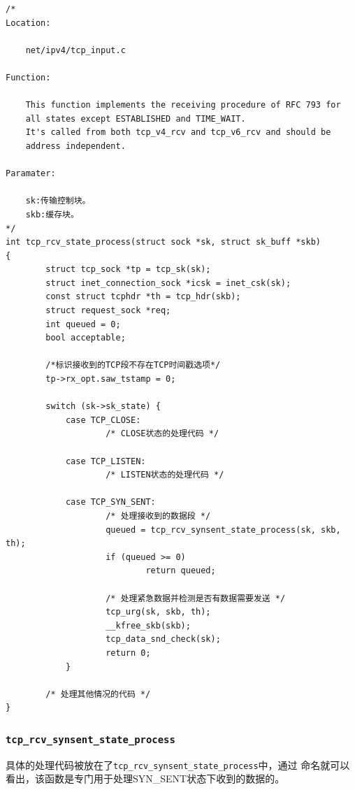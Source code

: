 \begin{verbatim}
/*
Location:

    net/ipv4/tcp_input.c

Function:

    This function implements the receiving procedure of RFC 793 for
    all states except ESTABLISHED and TIME_WAIT.
    It's called from both tcp_v4_rcv and tcp_v6_rcv and should be
    address independent.

Paramater:

    sk:传输控制块。
    skb:缓存块。
*/
int tcp_rcv_state_process(struct sock *sk, struct sk_buff *skb)
{
        struct tcp_sock *tp = tcp_sk(sk);
        struct inet_connection_sock *icsk = inet_csk(sk);
        const struct tcphdr *th = tcp_hdr(skb);
        struct request_sock *req;
        int queued = 0;
        bool acceptable;

        /*标识接收到的TCP段不存在TCP时间戳选项*/
        tp->rx_opt.saw_tstamp = 0;

        switch (sk->sk_state) {
            case TCP_CLOSE:
                    /* CLOSE状态的处理代码 */

            case TCP_LISTEN:
                    /* LISTEN状态的处理代码 */

            case TCP_SYN_SENT:
                    /* 处理接收到的数据段 */
                    queued = tcp_rcv_synsent_state_process(sk, skb, th);
                    if (queued >= 0)
                            return queued;

                    /* 处理紧急数据并检测是否有数据需要发送 */
                    tcp_urg(sk, skb, th);
                    __kfree_skb(skb);
                    tcp_data_snd_check(sk);
                    return 0;
            }

        /* 处理其他情况的代码 */
}
\end{verbatim}

    \subsubsection{\texttt{tcp_rcv_synsent_state_process}}
        具体的处理代码被放在了\texttt{tcp_rcv_synsent_state_process}中，通过
        命名就可以看出，该函数是专门用于处理SYN\_SENT状态下收到的数据的。

